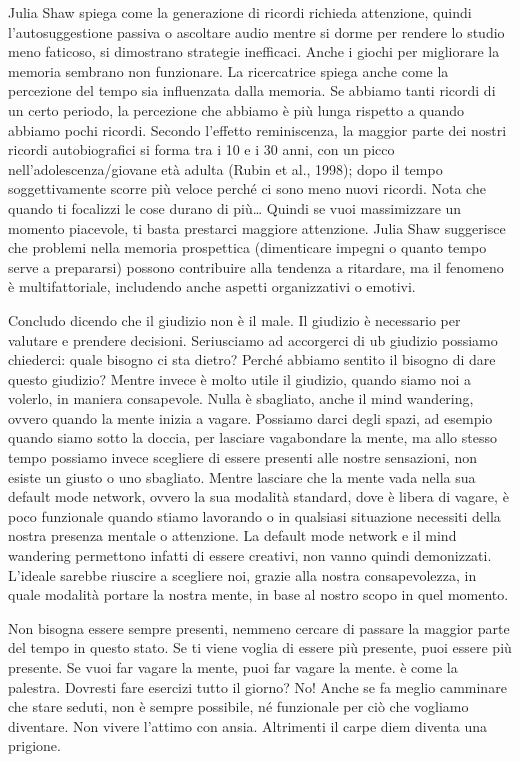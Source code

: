 \documentclass[12pt]{book} %
\begin{document}
\begin{mdframed}[linewidth=1pt]
Julia Shaw spiega come la generazione di ricordi richieda attenzione, quindi l'autosuggestione
passiva o ascoltare audio mentre si dorme per rendere lo studio meno faticoso, si dimostrano strategie inefficaci.
Anche i giochi per migliorare la memoria sembrano non funzionare. La ricercatrice spiega anche come la percezione del
tempo sia influenzata dalla memoria. Se abbiamo tanti ricordi di un certo periodo, la percezione che abbiamo è più
lunga rispetto a quando abbiamo pochi ricordi. Secondo l’effetto reminiscenza, la maggior parte dei nostri ricordi autobiografici si forma tra i 10 e i 30 anni, con un picco nell’adolescenza/giovane età adulta (Rubin et al., 1998); dopo il tempo soggettivamente scorre più veloce perché ci sono meno nuovi ricordi.
Nota che quando ti focalizzi le cose durano di più… Quindi se vuoi massimizzare un momento piacevole, ti basta prestarci maggiore attenzione.
Julia Shaw suggerisce che problemi nella memoria prospettica (dimenticare impegni o quanto tempo serve a prepararsi) possono contribuire alla tendenza a ritardare, ma il fenomeno è multifattoriale, includendo anche aspetti organizzativi o emotivi.
\end{mdframed}

Concludo dicendo che il giudizio non è il male. Il giudizio è necessario per valutare e prendere decisioni. Seriusciamo ad accorgerci di ub giudizio possiamo chiederci: quale bisogno ci sta dietro?
Perché abbiamo sentito il bisogno di dare questo giudizio? Mentre invece è molto utile il giudizio, quando siamo noi a
volerlo, in maniera consapevole.
Nulla è sbagliato, anche il mind wandering, ovvero quando la mente inizia a vagare. Possiamo darci degli spazi, ad
esempio quando siamo sotto la doccia, per lasciare vagabondare la mente, ma allo stesso tempo possiamo invece scegliere
di essere presenti alle nostre sensazioni, non esiste un giusto o uno sbagliato. Mentre lasciare che la mente vada
nella sua default mode network, ovvero la sua modalità standard, dove è libera di vagare, è poco funzionale quando
stiamo lavorando o in qualsiasi situazione necessiti della nostra presenza mentale o attenzione. 
La default mode network e il mind wandering permettono infatti di essere creativi, non vanno quindi
demonizzati.
L'ideale sarebbe riuscire a scegliere noi, grazie alla nostra consapevolezza, in quale modalità
portare la nostra mente, in base al nostro scopo in quel momento.

Non bisogna essere sempre presenti, nemmeno cercare di passare la maggior parte del tempo in questo stato. Se ti viene
voglia di essere più presente, puoi essere più presente. Se vuoi far vagare la mente, puoi far vagare la mente. è come
la palestra. Dovresti fare esercizi tutto il giorno? No! Anche se fa meglio camminare che stare seduti, non è sempre
possibile, né funzionale per ciò che vogliamo diventare. Non vivere l'attimo con ansia. Altrimenti il carpe diem diventa una prigione.
\end{document}

